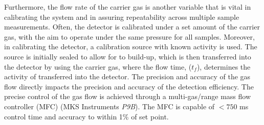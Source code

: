 Furthermore, the flow rate of the carrier gas is another variable that is vital in calibrating the system and in assuring repeatability across multiple sample measurements. Often, the detector is calibrated under a set amount of the carrier gas, with the aim to operate under the same pressure for all samples. Moreover, in calibrating the detector, a \RaTTS{} calibration source with known activity is used. The source is initially sealed to allow for \RnTTT{} to build-up, which is then transferred into the detector by using the carrier gas, where the flow time, ($t_{f}$), determines the activity of \RnTTT{} transferred into the detector. The precision and accuracy of the gas flow directly impacts the precision and accuracy of the detection efficiency. The precise control of the gas flow is achieved through a multi-gas/range mass flow controller (MFC) (MKS Instruments \textit{P9B}). The MFC is capable of $<750$ ms control time and accuracy to within 1\% of set point. 

